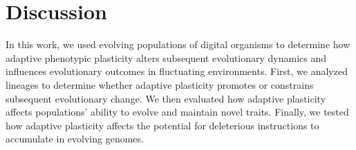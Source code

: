 





\section{Discussion}

In this work, we used evolving populations of digital organisms to determine how adaptive phenotypic plasticity alters subsequent evolutionary dynamics and influences evolutionary outcomes in fluctuating environments.
First, we analyzed lineages to determine whether adaptive plasticity promotes or constrains subsequent evolutionary change.
We then evaluated how adaptive plasticity affects populations' ability to evolve and maintain novel traits.
Finally, we tested how adaptive plasticity affects the potential for deleterious instructions to accumulate in evolving genomes.

